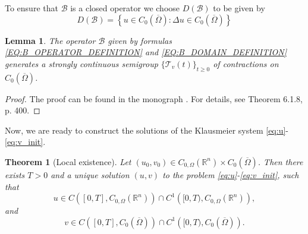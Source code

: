 \documentclass[12pt, a4paper]{article}
\theoremstyle{break}
\newtheorem{thm}{Theorem}[section]
\theoremstyle{break}
\theoremstyle{break}
\theoremstyle{break}
\theoremstyle{break}
\newtheorem{lem}{Lemma}[section]
\theoremstyle{break}
\theoremstyle{break}
\begin{document}
To ensure that $\mathcal{B}$ is a closed operator we choose $D(\mathcal{B})$ to be given by
\begin{equation}
    \label{EQ:B_DOMAIN_DEFINITION}
    D(\mathcal{B}) = \left\{ u \in C_0(\overline{\Omega}): \Delta u \in C_0(\overline{\Omega}) \right\}
\end{equation}
\begin{lem}
    \label{lem:B_SEMIGROUP_GENERATOR}
    The operator $\mathcal{B}$ given by formulas \eqref{EQ:B_OPERATOR_DEFINITION} and \eqref{EQ:B_DOMAIN_DEFINITION} generates a strongly continuous semigroup $\{\mathcal{T}_v(t)\}_{t \geq 0}$ of contractions on $C_0(\overline{\Omega})$.
\end{lem}
\begin{proof}
    The proof can be found in the monograph \cite{Arendt2001}. For details, see Theorem 6.1.8, p. 400.
\end{proof}
Now, we are ready to construct the solutions of the Klausmeier system \eqref{eq:u}-\eqref{eq:v_init}.
\begin{thm}[Local existence]
    \label{thm:Well-Posedness}
    Let $(u_0, v_0) \in C_{0, \Omega}(\mathbb{R}^n) \times C_0(\overline{\Omega})$. Then there exists $T > 0$ and a unique solution $(u, v)$ to the problem \eqref{eq:u}-\eqref{eq:v_init}, such that
    \begin{equation}
        u \in C\left([0, T], C_{0, \Omega}(\mathbb{R}^n)\right) \cap C^1\left([0, T), C_{0, \Omega}(\mathbb{R}^n)\right),
    \end{equation}
    and
    \begin{equation}
        v \in C\left([0, T], C_0(\overline{\Omega})\right) \cap C^1\left([0, T), C_0(\overline{\Omega})\right).
    \end{equation}
\end{thm}
\end{document}
